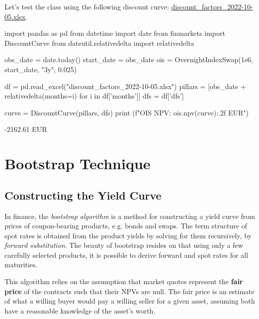 Let's test the class using the following discount curve: \href{https://github.com/matteosan1/finance_course/raw/master/input_files/discount_factors_2022-10-05.xlsx}{discount\_factors\_2022-10-05.xlsx}.

\begin{ipython}
import pandas as pd
from datetime import date
from finmarkets import DiscountCurve
from dateutil.relativedelta import relativedelta

obs_date = date.today()
start_date = obs_date
ois = OvernightIndexSwap(1e6, start_date, "3y", 0.025)

df = pd.read_excel("discount_factors_2022-10-05.xlsx")
pillars = [obs_date + relativedelta(months=i) for i in df['months']]
dfs = df['dfs']

curve = DiscountCurve(pillars, dfs)
print (f"OIS NPV: {ois.npv(curve):.2f} EUR")
\end{ipython}
\begin{ioutput}
-2162.61 EUR
\end{ioutput}

\section{Bootstrap Technique}
\label{bootstrapping-technique}



\subsection{Constructing the Yield Curve}
\label{the-bootstrapping-technique}

In finance, the \emph{bootstrap algorithm} is a method for constructing a yield curve from prices of coupon-bearing products, e.g. bonds and swaps. The term structure of spot rates is obtained from the product yields by solving for them recursively, by \emph{forward substitution}. 
The beauty of bootstrap resides on that using only a few carefully selected products, it is possible to derive forward and spot rates for all maturities.

This algorithm relies on the assumption that market quotes represent the \textbf{fair price} of the contracts such that their NPVs are null. The fair price is an estimate of what a willing buyer would pay a willing seller for a given asset, assuming both have a reasonable knowledge of the asset's worth.

